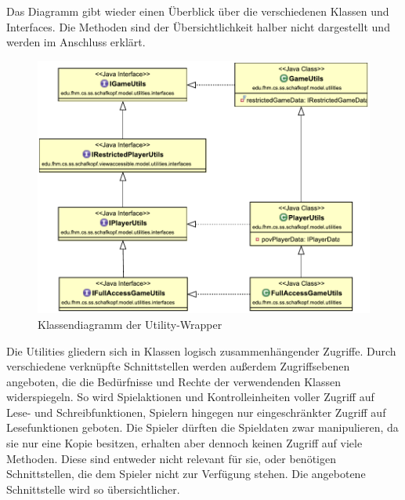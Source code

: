 \documentclass[
							a4paper, 
							11pt, 
							openany, 
							liststotoc,
							parskip=half, 
   							headings=normal
						]{scrreprt}
\begin{document}
{Das Diagramm gibt wieder einen Überblick über die verschiedenen Klassen und Interfaces. Die Methoden sind der Übersichtlichkeit halber nicht dargestellt und werden im Anschluss erklärt.

\begin{figure}[H]
\begin{center}
    \includegraphics[width=1.0\textwidth]{./pictures/uml/class_diagram/uml_class_utilitywrapper.pdf}
	\caption[Anwendung/Model -- Klassendiagramm Utility-Wrapper]{Klassendiagramm der Utility-Wrapper} \label{fig:model_utilitywrapper}
\end{center}
\end{figure}

Die Utilities gliedern sich in Klassen logisch zusammenhängender Zugriffe. Durch verschiedene verknüpfte Schnittstellen werden außerdem Zugriffsebenen angeboten, die die Bedürfnisse und Rechte der verwendenden Klassen widerspiegeln. So wird Spielaktionen und Kontrolleinheiten voller Zugriff auf Lese- und Schreibfunktionen, Spielern hingegen nur eingeschränkter Zugriff auf Lesefunktionen geboten. Die Spieler dürften die Spieldaten zwar manipulieren, da sie nur eine Kopie besitzen, erhalten aber dennoch keinen Zugriff auf viele Methoden. Diese sind entweder nicht relevant für sie, oder benötigen Schnittstellen, die dem Spieler nicht zur Verfügung stehen. Die angebotene Schnittstelle wird so übersichtlicher.

}
\end{document}
